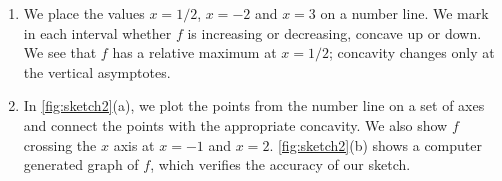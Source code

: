 \begin{example}
\begin{enumerate}
	\item	We place the values $x=1/2$, $x=-2$ and $x=3$ on a number line. We mark in each interval whether $f$ is increasing or decreasing, concave up or down. We see that $f$ has a relative maximum at $x=1/2$; concavity changes only at the vertical asymptotes.

\begin{center}
\end{center}
		
	\item	In \autoref{fig:sketch2}(a), we plot the points from the number line on a set of axes and connect the points with the appropriate concavity. We also show $f$ crossing the $x$ axis at $x=-1$ and $x=2$. \autoref{fig:sketch2}(b) shows a computer generated graph of $f$, which verifies the accuracy of our sketch.
\end{enumerate}
\end{example}

